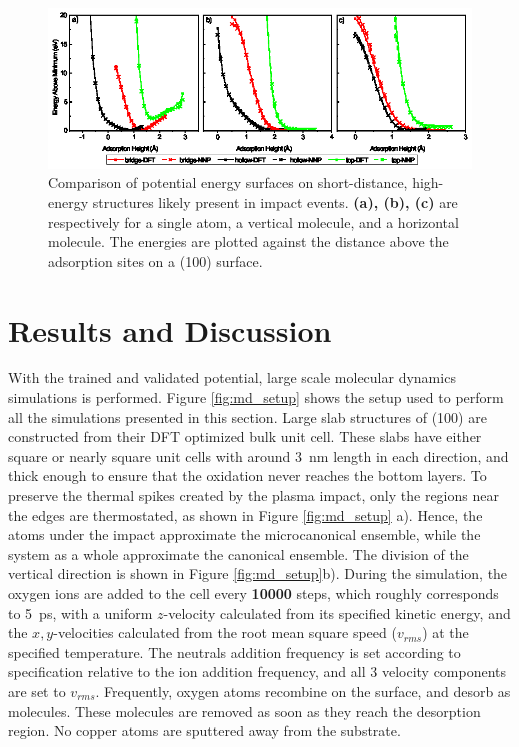 \documentclass[manuscript=cmatex]{achemso}
\begin{document}
\begin{figure}[h]
  \centering
  \includegraphics[width=\textwidth]{originprojects/closefig}
  \caption[Comparison of the PES calculated using DFT and NNP on simulated impact event]{Comparison of potential energy surfaces on short-distance, high-energy structures likely present in impact events. \textbf{(a), (b), (c)} are respectively for a single  atom, a vertical  molecule, and a horizontal  molecule. The energies are plotted against the distance above the adsorption sites on a  (100) surface.}
  \label{fig:val_close}
\end{figure}

\section{Results and Discussion}
With the trained and validated potential, large scale molecular dynamics simulations is performed. Figure \ref{fig:md_setup} shows the setup used to perform all the simulations presented in this section. Large slab structures of (100) are constructed from their DFT optimized bulk unit cell. These slabs have either square or nearly square unit cells with around \SI{3}{nm} length in each direction, and thick enough to ensure that the oxidation never reaches the bottom layers. To preserve the thermal spikes created by the plasma impact, only the regions near the edges are thermostated, as shown in Figure \ref{fig:md_setup} a). Hence, the atoms under the impact approximate the microcanonical ensemble, while the system as a whole approximate the canonical ensemble. The division of the vertical direction is shown in Figure \ref{fig:md_setup}b). During the simulation, the oxygen ions are added to the cell every \textbf{10000} steps, which roughly corresponds to \SI{5}{ps}, with a uniform $z$-velocity calculated from its specified kinetic energy, and the $x,y$-velocities calculated from the root mean square speed ($v_{rms}$) at the specified temperature. The neutrals addition frequency is set according to specification relative to the ion addition frequency, and all 3 velocity components are set to $v_{rms}$. Frequently, oxygen atoms recombine on the surface, and desorb as  molecules. These molecules are removed as soon as they reach the desorption region. No copper atoms are sputtered away from the substrate. 
\end{document}

